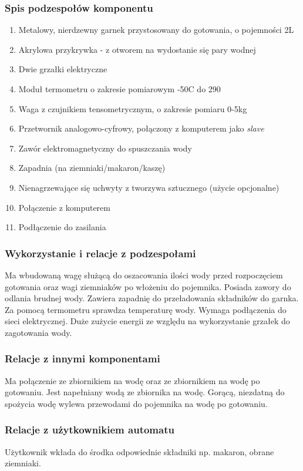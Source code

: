 \documentclass[12pt,a4paper,notitlepage]{article}
\begin{document}
\subsubsection{Spis podzespołów komponentu}
\begin{enumerate}
  \item Metalowy, nierdzewny garnek przystosowany do gotowania, o pojemności 2L
  \item Akrylowa przykrywka - z otworem na wydostanie się pary wodnej
  \item Dwie grzałki elektryczne
  \item Moduł termometru o zakresie pomiarowym -50\degree C do 290\degree
  \item Waga z czujnikiem tensometrycznym, o zakresie pomiaru 0-5kg
  \item Przetwornik analogowo-cyfrowy, połączony z komputerem jako \emph{slave}
  \item Zawór elektromagnetyczny do spuszczania wody
  \item Zapadnia (na ziemniaki/makaron/kaszę)
  \item Nienagrzewające się uchwyty z tworzywa sztucznego (użycie opcjonalne)
  \item Połączenie z komputerem
  \item Podłączenie do zasilania
\end{enumerate}
 
\subsubsection{Wykorzystanie i relacje z podzespołami}
Ma wbudowaną wagę służącą do oszacowania ilości wody przed rozpoczęciem gotowania oraz wagi ziemniaków po włożeniu do pojemnika. Posiada zawory do odlania brudnej wody. Zawiera zapadnię do przeładowania składników do garnka. Za pomocą termometru sprawdza temperaturę wody. Wymaga podłączenia do sieci elektrycznej. Duże zużycie energii ze względu na wykorzystanie grzałek do zagotowania wody.

\subsubsection{Relacje z innymi komponentami}
Ma połączenie ze zbiornikiem na wodę oraz ze zbiornikiem na wodę po gotowaniu. Jest napełniany wodą ze zbiornika na wodę. Gorącą, niezdatną do spożycia wodę wylewa przewodami do pojemnika na wodę po gotowaniu.

\subsubsection{Relacje z użytkownikiem automatu}
Użytkownik wkłada do środka odpowiednie składniki np. makaron, obrane ziemniaki.
\end{document}
